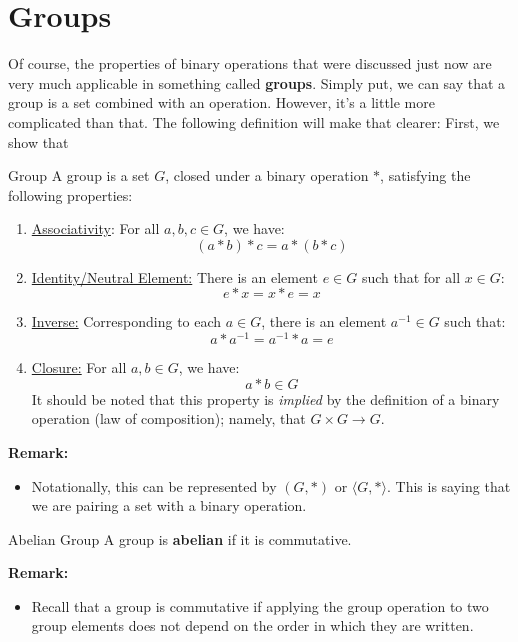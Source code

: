\documentclass[letterpaper]{article}
\begin{document}
\section{Groups}
Of course, the properties of binary operations that were discussed just now are very much applicable in something called \textbf{groups}. Simply put, we can say that a group is a set combined with an operation. However, it's a little more complicated than that. The following definition will make that clearer:
First, we show that\begin{definition}{Group}{}
    A group is a set $G$, closed under a binary operation $*$, satisfying the following properties:
    \begin{enumerate}
        \item \underline{Associativity}: For all $a, b, c \in G$, we have:
        \[(a * b) * c = a * (b * c)\]

        \item \underline{Identity/Neutral Element:} There is an element $e \in G$ such that for all $x \in G$:
        \[e * x = x * e = x\]

        \item \underline{Inverse:} Corresponding to each $a \in G$, there is an element $a^{-1} \in G$ such that:
        \[a * a^{-1} = a^{-1} * a = e\]

        \item \underline{Closure:} For all $a, b \in G$, we have:
        \[a * b \in G\]
        It should be noted that this property is \emph{implied} by the definition of a binary operation (law of composition); namely, that $G \times G \to G$.  
    \end{enumerate}
\end{definition}
\textbf{Remark:}
\begin{itemize}
    \item Notationally, this can be represented by $(G, *)$ or $\langle G, * \rangle$. This is saying that we are pairing a set with a binary operation. 
\end{itemize}

\begin{definition}{Abelian Group}{}
    A group is \textbf{abelian} if it is commutative.
\end{definition}
\textbf{Remark:}
\begin{itemize}
    \item Recall that a group is commutative if applying the group operation to two group elements does not depend on the order in which they are written. 
\end{itemize}
\end{document}
